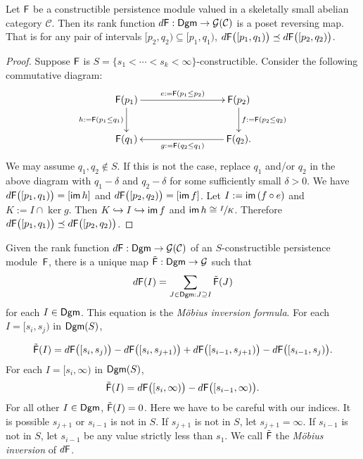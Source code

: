 \documentclass[12pt]{article}
\begin{document}
\begin{prop}
Let ${\mathsf{F}}$ be a constructible persistence module valued in a skeletally small abelian category
$\mathcal{C}$.
Then its rank function $d {\mathsf{F}} : {\mathsf{Dgm}} \to {\mathcal{G}}(\mathcal{C})$ is a poset
reversing map.
That is for any pair of intervals 
$[p_2, q_2) \subseteq [p_1,q_1)$, 
$d {\mathsf{F}} \big( [p_1, q_1) \big) \preceq d {\mathsf{F}} \big( [p_2,q_2) \big)$.
\end{prop}
\begin{proof}
Suppose ${\mathsf{F}}$ is $S = \{s_1 < \cdots < s_k < \infty\}$-constructible.
Consider the following commutative diagram:
	\begin{equation*}
	\xymatrix{
	\Ffunc(p_1) \ar[d]_{h := \Ffunc (p_1 \leq q_1)} \ar[rrr]^{e := \Ffunc(p_1 \leq p_2)} 
	&&& \Ffunc(p_2) \ar[d]^{f := \Ffunc(p_2 \leq q_2)} \\
	\Ffunc(q_1) &&& \Ffunc(q_2). \ar[lll]^{g := \Ffunc(q_2 \leq q_1)}
	}
	\end{equation*}
We may assume $q_1, q_2 \notin S$.
If this is not the case, replace $q_1$ and/or $q_2$ in the above diagram with 
$q_1 - \delta$ and $q_2 - \delta$ for some sufficiently small $\delta > 0$.
We have $d {\mathsf{F}} \big( [p_1, q_1) \big) = [ \mathsf{im}\, h ]$ and
$d {\mathsf{F}} \big( [p_2, q_2) \big) =  [ \mathsf{im}\, f ]$.
Let $I := \mathsf{im}\, ( f \circ e )$ and $K := I \cap \ker g$.
Then $K \hookrightarrow I \hookrightarrow \mathsf{im}\, f$ and $\mathsf{im}\, h \cong \sfrac{I}{K}$.
Therefore $d {\mathsf{F}} \big ( [p_1, q_1) \big) \preceq d {\mathsf{F}} \big( [p_2, q_2 ) \big)$.
\end{proof}

Given the rank function $d {\mathsf{F}} : {\mathsf{Dgm}} \to {\mathcal{G}}(\mathcal{C})$
of an  $S$-constructible persistence module~${\mathsf{F}}$, there is a unique
map $\tilde {{\mathsf{F}}} : {\mathsf{Dgm}} \to {\mathcal{G}}$ such that
	\begin{equation}
	\label{eq:mobius}
	d {\mathsf{F}} (I) =  \sum_{J \in {\mathsf{Dgm}}: J \supseteq I } \tilde {{\mathsf{F}}} (J)
	\end{equation}
for each $I \in {\mathsf{Dgm}}$.
This equation is the \emph{M\"obius inversion formula}.
For each $I = [s_i, s_j)$ in ${\mathsf{Dgm}}(S)$,

	\begin{equation}
	\label{eq:inversion}
	\tilde {{\mathsf{F}}} (I) = d {\mathsf{F}}  \big( [s_i, s_j) \big) - d {\mathsf{F}} \big( [s_{i}, s_{j+1}) \big)
	+ d {\mathsf{F}} \big( [s_{i-1}, s_{j+1}) \big) - d {\mathsf{F}} \big( [s_{i-1}, s_j) \big).
	\end{equation}
For each $I = [s_i, \infty)$ in ${\mathsf{Dgm}}(S)$,
	\begin{equation}
	\label{eq:inversion_infty}
	\tilde {{\mathsf{F}}} (I) = d {\mathsf{F}}  \big( [s_i, \infty) \big) - d {\mathsf{F}} \big( [s_{i-1}, \infty) \big).
	\end{equation}
For all other $I \in {\mathsf{Dgm}}$, $\tilde {{\mathsf{F}}}(I) = 0$.
Here we have to be careful with our indices.
It is possible $s_{j+1}$ or $s_{i-1}$ is not in $S$.
If $s_{j+1}$ is not in $S$, let $s_{j+1} = \infty$.
If $s_{i-1}$ is not in $S$, let $s_{i-1}$ be any value strictly less than $s_1$.
We call $\tilde {{\mathsf{F}}}$ the \emph{M\"obius inversion} of $d {\mathsf{F}}$.
\end{document}
